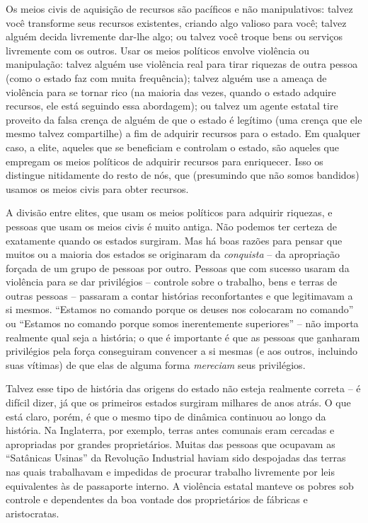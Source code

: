 Os meios civis de aquisição de recursos são pacíficos e não manipulativos: talvez você transforme seus recursos existentes, criando algo valioso para você; talvez alguém decida livremente dar-lhe algo; ou talvez você troque bens ou serviços livremente com os outros. Usar os meios políticos envolve violência ou manipulação: talvez alguém use violência real para tirar riquezas de outra pessoa (como o estado faz com muita frequência); talvez alguém use a ameaça de violência para se tornar rico (na maioria das vezes, quando o estado adquire recursos, ele está seguindo essa abordagem); ou talvez um agente estatal tire proveito da falsa crença de alguém de que o estado é legítimo (uma crença que ele mesmo talvez compartilhe) a fim de adquirir recursos para o estado. Em qualquer caso, a elite, aqueles que se beneficiam e controlam o estado, são aqueles que empregam os meios políticos de adquirir recursos para enriquecer. Isso os distingue nitidamente do resto de nós, que (presumindo que não somos bandidos) usamos os meios civis para obter recursos.

A divisão entre elites, que usam os meios políticos para adquirir riquezas, e pessoas que usam os meios civis é muito antiga. Não podemos ter certeza de exatamente quando os estados surgiram. Mas há boas razões para pensar que muitos ou a maioria dos estados se originaram da \emph{conquista} -- da apropriação forçada de um grupo de pessoas por outro. Pessoas que com sucesso usaram da violência para se dar privilégios -- controle sobre o trabalho, bens e terras de outras pessoas -- passaram a contar histórias reconfortantes e que legitimavam a si mesmos. ``Estamos no comando porque os deuses nos colocaram no comando'' ou ``Estamos no comando porque somos inerentemente superiores'' -- não importa realmente qual seja a história; o que é importante é que as pessoas que ganharam privilégios pela força conseguiram convencer a si mesmas (e aos outros, incluindo suas vítimas) de que elas de alguma forma \emph{mereciam} seus privilégios.

Talvez esse tipo de história das origens do estado não esteja realmente correta -- é difícil dizer, já que os primeiros estados surgiram milhares de anos atrás. O que está claro, porém, é que o mesmo tipo de dinâmica continuou ao longo da história. Na Inglaterra, por exemplo, terras antes comunais eram cercadas e apropriadas por grandes proprietários. Muitas das pessoas que ocupavam as ``Satânicas Usinas'' da Revolução Industrial haviam sido despojadas das terras nas quais trabalhavam e impedidas de procurar trabalho livremente por leis equivalentes às de passaporte interno. A violência estatal manteve os pobres sob controle e dependentes da boa vontade dos proprietários de fábricas e aristocratas.

